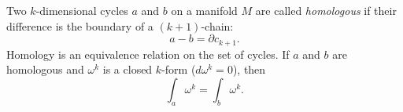 Two $k$-dimensional cycles $a$ and $b$ on a manifold $M$ are called \textit{homologous} if their difference is the boundary of a $(k+1)$-chain:
$$a - b = \partial c_{k+1}.$$
Homology is an equivalence relation on the set of cycles. If $a$ and $b$ are homologous and $\omega^k$ is a closed $k$-form ($d\omega^k = 0$), then
$$\int_a \omega^k = \int_b \omega^k.$$
